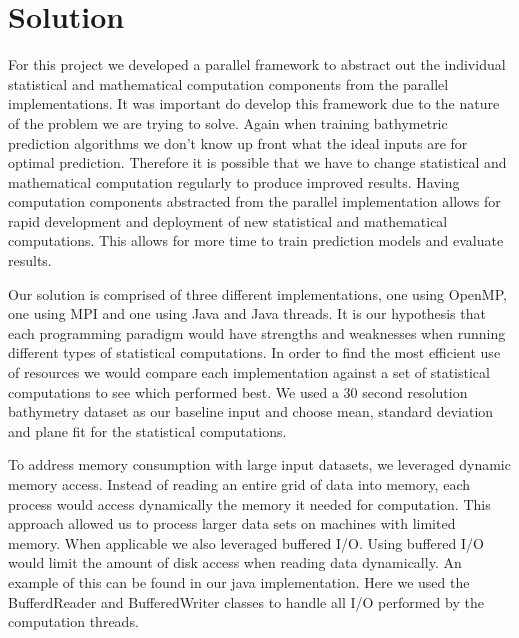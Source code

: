 \section{Solution}
For this project we developed a parallel framework to abstract out the individual statistical and mathematical computation components from the parallel implementations. 
It was important do develop this framework due to the nature of the problem we are trying to solve. 
Again when training bathymetric prediction algorithms we don’t know up front what the ideal inputs are for optimal prediction. 
Therefore it is possible that we have to change statistical and mathematical computation regularly to produce improved results. 
Having computation components abstracted from the parallel implementation allows for rapid development and deployment of new statistical and mathematical computations. 
This allows for more time to train prediction models and evaluate results.

\par
Our solution is comprised of three different implementations, one using OpenMP, one using MPI and one using Java and Java threads. 
It is our hypothesis that each programming paradigm would have strengths and weaknesses when running different types of statistical computations. 
In order to find the most efficient use of resources we would compare each implementation against a set of statistical computations to see which performed best. 
We used a 30 second resolution bathymetry dataset as our baseline input and choose mean, standard deviation and plane fit for the statistical computations.

\par
To address memory consumption with large input datasets, we leveraged dynamic memory access. 
Instead of reading an entire grid of data into memory, each process would access dynamically the memory it needed for computation. 
This approach allowed us to process larger data sets on machines with limited memory. 
When applicable we also leveraged buffered I/O. 
Using buffered I/O would limit the amount of disk access when reading data dynamically. 
An example of this can be found in our java implementation. 
Here we used the BufferdReader and BufferedWriter classes to handle all I/O performed by the computation threads.
